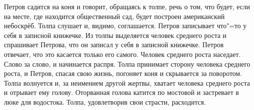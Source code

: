 Петров садится на коня и говорит, обращаясь к толпе, речь о том, что будет, если на месте, где находится общественный сад, будет построен американский небоскрёб. Толпа слушает и, видимо, соглашается. Петров записывает что"=то у себя в записной книжечке. Из толпы выделяется человек среднего роста и спрашивает Петрова, что он записал у себя в записной книжечке. Петров отвечает, что это касается только его самого. Человек среднего роста наседает. Слово за слово, и начинается распря. Толпа принимает сторону человека среднего роста, и Петров, спасая свою жизнь, погоняет коня и скрывается за поворотом. Толпа волнуется и, за неимением другой жертвы, хватает человека среднего роста и отрывает ему голову. Оторванная голова катится по мостовой и застревает в люке для водостока. Толпа, удовлетворив свои страсти, расходится.